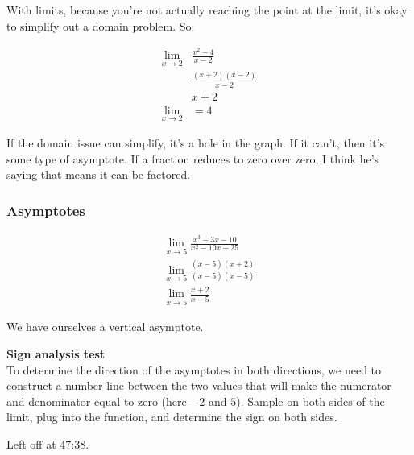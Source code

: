 \documentclass{article}
\begin{document}
\begin{enumerate}
With limits, because you're not actually reaching the point at the limit, it's okay to
simplify out a domain problem. So:

\begin{align*}
    \lim_{x\to 2} &\frac{x^2 -4}{x-2}\\
                  & \frac{(x+2)(x-2)}{x-2}\\
                  & x+2\\
    \lim_{x\to 2} &= 4
\end{align*}

If the domain issue can simplify, it's a hole in the graph. If it can't, then it's some
type of asymptote. If a fraction reduces to zero over zero, I think he's saying that means
it can be factored.

\subsubsection{Asymptotes}

\begin{align*}
    \lim_{x \to 5} \frac{x^3 - 3x - 10}{x^2 - 10x + 25}\\
    \lim_{x \to 5} \frac{(x-5)(x+2)}{(x-5)(x-5)}\\
    \lim_{x \to 5} \frac{x+2}{x-5}
\end{align*}

We have ourselves a vertical asymptote.

\textbf{Sign analysis test}\\

To determine the direction of the asymptotes in both directions, we need to construct a
number line between the two values that will make the numerator and denominator equal to
zero (here $-2$ and $5$). Sample on both sides of the limit, plug into the function, and
determine the sign on both sides.


    
Left off at 47:38.


\end{enumerate}
\end{document}
